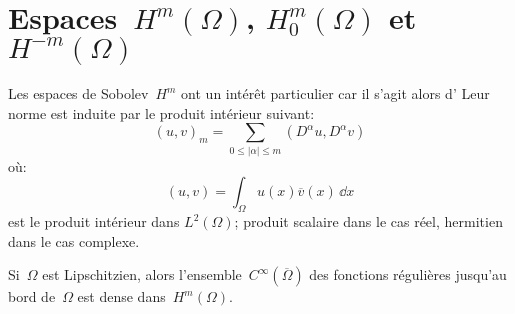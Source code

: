 \medskip
\section{Espaces~$H^m(\Omega)$, $H^m_0(\Omega)$ et~$H^{-m}(\Omega)$}

\begin{definition}\label{Th-Hm}
\end{definition}

\medskip
Les espaces de Sobolev~$H^m$ ont un intérêt particulier car il s'agit alors d'
Leur norme est induite par le produit intérieur suivant:
\begin{equation}(u,v)_{m} =\sum \limits _{0 \leqslant \vert \alpha\vert\leqslant m} \left( D^{\alpha} u, D^{\alpha} v\right)
\end{equation}
où: 
\begin{equation}(u,v) = \int_{\Omega} u(x) \overline{v}(x)\, \dd x
\end{equation}
est le produit intérieur dans $L^{2} ( \Omega)$; produit scalaire dans le cas réel, hermitien dans le cas complexe.

\begin{theoreme}
Si~$\Omega$ est Lipschitzien, alors l'ensemble~$C^\infty(\overline{\Omega})$ des fonctions régulières jusqu'au bord de~$\Omega$ est dense dans~$H^m(\Omega)$.
\end{theoreme}

